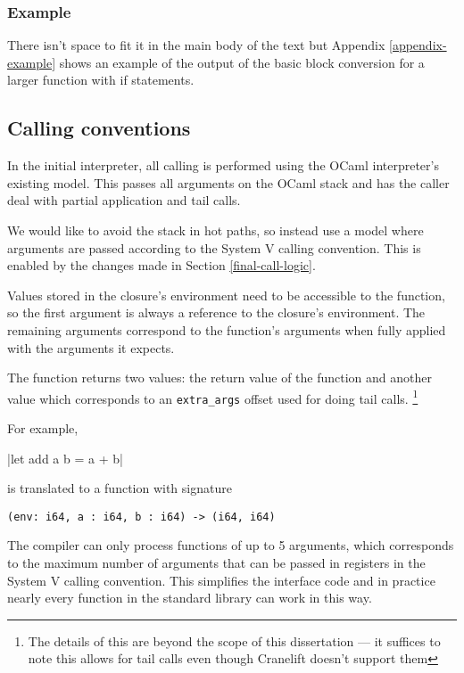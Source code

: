 \subsubsection{Example}

There isn't space to fit it in the main body of the text but Appendix \ref{appendix-example} shows
an example of the output of the basic block conversion for a larger function with if statements.

\subsection{Calling conventions} \label{calling-conventions}

In the initial interpreter, all calling is performed using the OCaml interpreter's existing model.
This
passes all arguments on the OCaml stack and has the caller deal with partial application and tail
calls.

We would like to avoid the stack in hot paths, so instead use a model where arguments are passed
according to the
System V calling convention. This is enabled by the changes made in Section \ref{final-call-logic}.

Values stored in the closure's environment need to be accessible to the function, so the first
argument is always a reference to the closure's environment. The remaining arguments correspond to
the function's arguments when fully applied with the arguments it expects.

The function returns two values: the return value of the function and another value which
corresponds to an \texttt{extra\_args} offset used for doing tail calls.
\footnote{The details of this are beyond the scope of this dissertation --- it suffices to note
      this allows for tail calls even though Cranelift doesn't support them}

For example,

|let add a b = a + b|

is translated to a function with signature

\begin{verbatim}
(env: i64, a : i64, b : i64) -> (i64, i64)
\end{verbatim}

The compiler can only process functions of up to 5 arguments, which corresponds to the
maximum number of arguments that can be passed in registers in the
System V calling convention. This simplifies the interface code and in practice nearly every
function in the standard library can work in this way.

